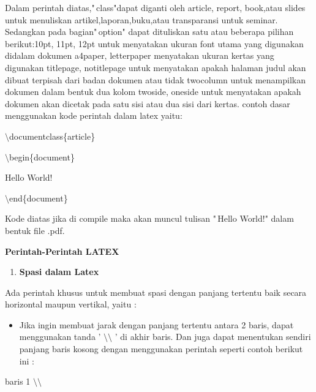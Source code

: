 Dalam perintah diatas,"\,class"dapat diganti oleh article, report, book,atau slides untuk menuliskan artikel,laporan,buku,atau transparansi untuk seminar. Sedangkan pada bagian"\,option" dapat dituliskan satu 
atau beberapa pilihan berikut:10pt, 11pt, 12pt untuk menyatakan ukuran font utama yang digunakan didalam dokumen a4paper, letterpaper menyatakan ukuran kertas yang digunakan titlepage, notitlepage untuk menyatakan apakah halaman judul akan dibuat terpisah dari badan dokumen atau tidak twocolumn untuk menampilkan dokumen dalam bentuk dua kolom twoside, oneside untuk menyatakan apakah dokumen akan dicetak pada satu 
sisi atau dua sisi dari kertas. contoh dasar menggunakan kode perintah dalam latex yaitu:\par \vspace{12pt}

$\setminus$documentclass\{article\}\par \vspace{12pt}

$\setminus$begin\{document\}\par \vspace{12pt}

Hello World!\par \vspace{12pt}

$\setminus$end\{document\}\par \vspace{12pt}

Kode diatas jika di compile maka akan muncul tulisan "\,Hello World!" 
dalam bentuk file .pdf.\par \vspace{12pt}

\textbf{Perintah-Perintah LATEX}

\begin{enumerate}
\item \textbf{Spasi dalam Latex}
\setcounter{numberedCntB}{\theenumi}
\end{enumerate}
Ada perintah khusus untuk membuat spasi dengan panjang tertentu baik secara horizontal maupun vertikal, yaitu :

\begin{itemize}
\item Jika ingin membuat jarak dengan panjang tertentu antara 2 baris, dapat menggunakan tanda ' $\setminus$$\setminus$ ' di akhir baris. Dan juga dapat menentukan sendiri panjang baris kosong dengan menggunakan perintah seperti contoh berikut ini :
\end{itemize}
\hspace{0,2in}baris 1 $\setminus$$\setminus$

